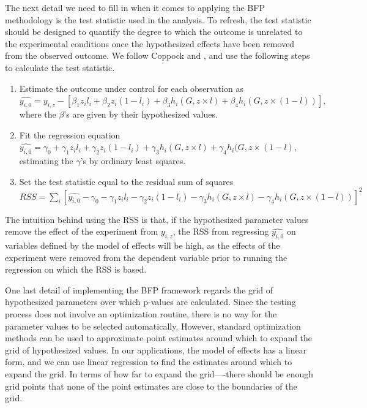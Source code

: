\documentclass[12pt]{article}
\begin{document}
The next detail we need to fill in when it comes to applying the BFP methodology is the test statistic used in the analysis. To refresh, the test statistic should be designed to quantify the degree to which the outcome is unrelated to the experimental conditions once the hypothesized effects have been removed from the observed outcome. We follow Coppock and \citet{bowers2016research}, and use the following steps to calculate the test statistic.
\begin{enumerate}
\item Estimate the outcome under control for each observation as \\ $\hat{y_{i,0} } = y_{i,z} - \left[ \beta_1z_il_i+\beta_2z_i(1-l_i)+\beta_3h_i(G,z\times l)+\beta_4h_i(G,z\times (1-l)) \right],$ where the $\beta$'s are given by their hypothesized values.
\item Fit the regression equation  \\ $ \hat{y_{i,0} } = \gamma_0 + \gamma_1z_il_i+\gamma_2z_i(1-l_i)+\gamma_3h_i(G,z\times l)+\gamma_4h_i(G,z\times (1-l)$, estimating the $\gamma$'s by ordinary least squares. 
\item Set the test statistic equal to the residual sum of squares \\ $ RSS =  \sum_i \left[ \hat{y_{i,0} }-  \gamma_0 - \gamma_1z_il_i-\gamma_2z_i(1-l_i)-\gamma_3h_i(G,z\times l)-\gamma_4h_i(G,z\times (1-l) ) \right]^2$
\end{enumerate}
The intuition behind using the RSS is that, if the hypothesized parameter values remove the effect of the experiment from $y_{i,z}$, the RSS from regressing $\hat{y_{i,0} } $ on variables defined by the model of effects will be high, as the effects of the experiment were removed from the dependent variable prior to running the regression on which the RSS is based. 

One last detail of implementing the BFP framework regards the grid of hypothesized parameters over which p-values are calculated. Since the testing process does not involve an optimization routine, there is no way for the parameter values to be selected automatically. However, standard optimization methods can be used to approximate point estimates around which to expand the grid of hypothesized values. In our applications, the model of effects has a linear form, and we can use linear regression to find the estimates around which to expand the grid. In terms of how far to expand the grid----there should be enough grid points that none of the point estimates are close to the boundaries of the grid.
\end{document}
